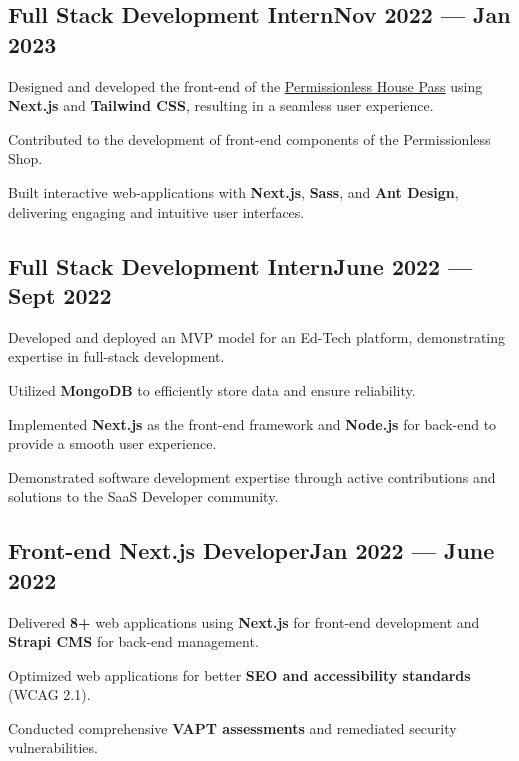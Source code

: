 \subsection{{Full Stack Development Intern\hfill Nov 2022 --- Jan 2023}}
\begin{zitemize}
\item Designed and developed the front-end of the \href{https://permissionless.house}{Permissionless House Pass} using \textbf{Next.js} and \textbf{Tailwind CSS}, resulting in a seamless user experience.
\item Contributed to the development of front-end components of the Permissionless Shop.
\item Built interactive web-applications with \textbf{Next.js}, \textbf{Sass}, and \textbf{Ant Design}, delivering engaging and intuitive user interfaces.
\end{zitemize}

\subsection{{Full Stack Development Intern\hfill June 2022 --- Sept 2022}}
\begin{zitemize}
\item Developed and deployed an MVP model for an Ed-Tech platform, demonstrating expertise in full-stack development.
\item Utilized \textbf{MongoDB} to efficiently store data and ensure reliability.
\item Implemented \textbf{Next.js} as the front-end framework and \textbf{Node.js} for back-end to provide a smooth user experience.
\item Demonstrated software development expertise through active contributions and solutions to the SaaS Developer community.
\end{zitemize}

\subsection{{Front-end Next.js Developer\hfill Jan 2022 --- June 2022}}
\begin{zitemize}
\item Delivered \textbf{8+} web applications using \textbf{Next.js} for front-end development and \textbf{Strapi CMS} for back-end management.
\item Optimized web applications for better \textbf{SEO and accessibility standards} (WCAG 2.1).
\item Conducted comprehensive \textbf{VAPT assessments} and remediated security vulnerabilities.
\end{zitemize}

